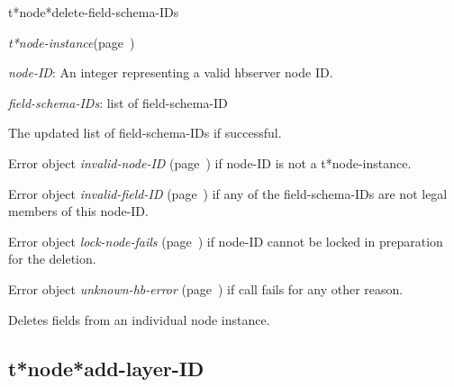 \begin{description}
\item [Name:]  t*node*delete-field-schema-IDs

\item [Class:] {\sl t*node-instance}\hfill(page~\pageref{t*node-instance})

\item [Parameters:]
\item {\sl node-ID}:   An integer representing
a valid hbserver node ID.

\item {\sl field-schema-IDs}:  list of field-schema-ID


\item [Return-value:]
The updated list of field-schema-IDs if successful.

Error object {\sl invalid-node-ID} (page~\pageref{invalid-node-ID}) if node-ID is not
a t*node-instance.

Error object {\sl invalid-field-ID} (page~\pageref{invalid-field-ID}) if any of the 
field-schema-IDs are not legal members of this
node-ID.

Error object {\sl lock-node-fails} (page~\pageref{lock-node-fails}) if node-ID cannot
be locked in preparation for the deletion. 

Error object {\sl unknown-hb-error} (page~\pageref{unknown-hb-error}) if call fails
for any other reason.

\item [Description:]

Deletes fields from an individual node instance. 

\item [Public:]



\end{description}
\horizontalline

\subsection{t*node*add-layer-ID}
\label{t*node*add-layer-ID}

